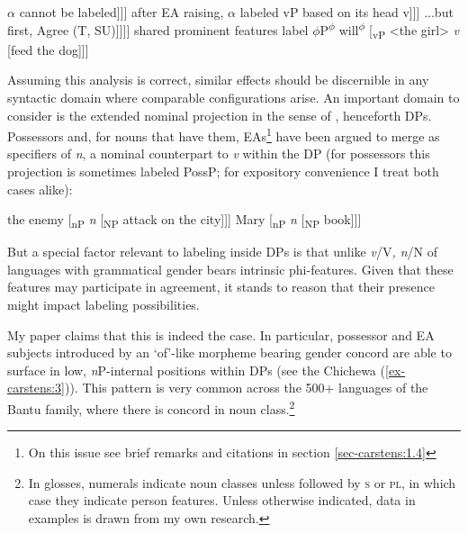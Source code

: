 \documentclass[output=paper
,modfonts
,nonflat]{langsci/langscibook}
\begin{document}
\begin{exe} 
\ex \label{ex-carstens:1} \xlist
	\ex \label{ex-carstens:1a} $\alpha$ cannot be labeled\newline
	[$\alpha$ [\textsubscript{DP} the girl] [\textsubscript{vP} \textit{v} [\textsubscript{VP} feed [\textsubscript{DP} the dog]]]] 
	\ex \label{ex-carstens:1b}after EA raising, $\alpha$ labeled vP based on its head v\newline
	[\textsubscript{vP} {\textless}the girl{\textgreater} [\textsubscript{vP} \textit{v} [\textsubscript{VP} feed [\textsubscript{DP} the dog]]]] 
	\ex \label{ex-carstens:1c} ...but first, Agree (T, SU)\newline
	[T\textsubscript{u$\phi$} [\textsubscript{vP} [\textsubscript{DP} the girl\textsubscript{$\phi$}] [\textsubscript{vP} \textit{v} [\textsubscript{VP} feed [\textsubscript{DP} the dog]]]]] 
	\ex \label{ex-carstens:d}shared prominent features label $\phi$P\newline
	[\textsubscript{$\phi$P} [\textsubscript{DP} the girl]\textsuperscript{$\phi$} will\textsuperscript{$\phi$} [\textsubscript{vP} <the girl> \textit{v} [feed the dog]]]  
\endxlist
\end{exe}
Assuming this analysis is correct, similar effects should be discernible in any syntactic domain where comparable configurations arise. An important domain to consider is the extended nominal projection in the sense of \citet{Grimshaw19912005}, henceforth DPs. Possessors and, for nouns that have them, EAs\footnote{On this issue see brief remarks and citations in section \ref{sec-carstens:1.4}} have been argued to merge as specifiers of \textit{n}, a nominal counterpart to \textit{v} within the DP (for possessors this projection is sometimes labeled PossP; for expository convenience I treat both cases alike): 

\begin{exe}
\ex \label{ex-carstens:2}\xlist
	\ex {[\textsubscript{$\alpha$}} the enemy [\textsubscript{nP} \textit{n} [\textsubscript{NP} attack on the city]]]
	\ex {[\textsubscript{$\alpha$}} Mary [\textsubscript{nP} \textit{n} [\textsubscript{NP} book]]]
\endxlist
\end{exe}
But a special factor relevant to labeling inside DPs is that unlike \textit{v}/V\textit{, n}/N of languages with grammatical gender bears intrinsic phi-features. Given that these features may participate in agreement, it stands to reason that their presence might impact labeling possibilities.

My paper claims that this is indeed the case. In particular, possessor and EA {\textquotedbl}subjects{\textquotedbl} introduced by an `of'-like morpheme bearing gender concord are able to surface in low, \textit{n}P-internal positions within DPs (see the Chichewa (\ref{ex-carstens:3})). This pattern is very common across the 500+ languages of the Bantu family, where there is concord in noun class.\footnote{In glosses, numerals indicate noun classes unless followed by \textsc{s} or \textsc{pl}, in which case they indicate person features. Unless otherwise indicated, data in examples is drawn from my own research.}
\end{document}

